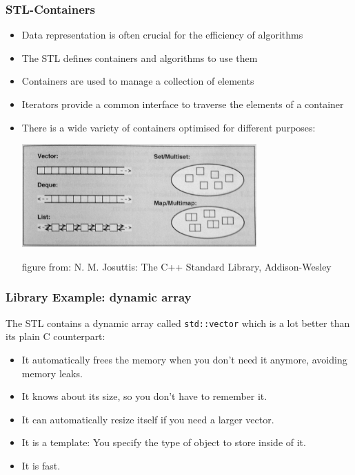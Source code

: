 \documentclass[aspectratio=169,ignorenonframetext,11pt]{beamer}
\def\inline{\lstinline[basicstyle=\small\ttfamily]}
\begin{document}
\begin{frame}
\frametitle{STL-Containers}

\begin{itemize}
\item Data representation is often crucial for the efficiency of algorithms
\item The STL defines containers and algorithms to use them
\item Containers are used to manage a collection of elements
\item Iterators provide a common interface to traverse the elements of a container
\item There is a wide variety of containers optimised for different purposes:
\begin{center}
\includegraphics[width=9cm]{containers.jpg}

figure from: N. M. Josuttis: The C++ Standard Library, Addison-Wesley
\end{center}
\end{itemize}

\end{frame}



\begin{frame}
  \frametitle{Library Example: dynamic array}
  The STL contains a dynamic array called \inline!std::vector! which is a lot better than its plain
  C counterpart:
  \begin{itemize}
  \item It automatically frees the memory when you don't need it anymore, avoiding memory leaks.
  \item It knows about its size, so you don't have to remember it.
  \item It can automatically resize itself if you need a larger vector.
  \item It is a template: You specify the type of object to store inside of it.
  \item It is fast.
  \end{itemize}
\end{frame}
\end{document}

